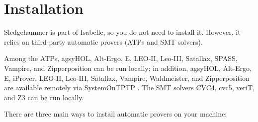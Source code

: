 \documentclass[a4paper,12pt]{article}
\renewcommand\_{\hbox{\textunderscore\kern-.05ex}}
\begin{document}
\section{Installation}
\label{installation}

Sledgehammer is part of Isabelle, so you do not need to install it. However, it
relies on third-party automatic provers (ATPs and SMT solvers).

Among the ATPs, agsyHOL, Alt-Ergo, E, LEO-II, Leo-III, Satallax, SPASS, Vampire,
and Zipperposition can be run locally; in addition, agsyHOL, Alt-Ergo, E,
iProver, LEO-II, Leo-III, Satallax, Vampire, Waldmeister, and Zipperposition are
available remotely via System\-On\-TPTP \cite{sutcliffe-2000}. The SMT solvers
CVC4, cvc5, veriT, and Z3 can be run locally.

There are three main ways to install automatic provers on your machine:
\end{document}
